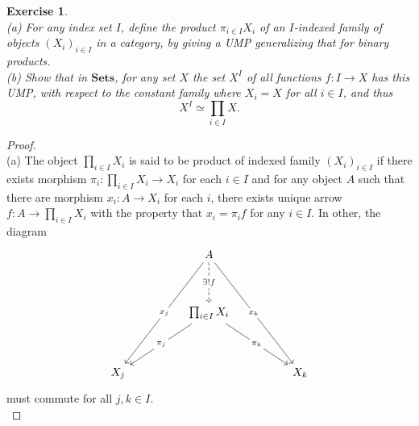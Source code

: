 \documentclass[a4paper, 11pt]{book}
\theoremstyle{plain}
\newtheorem{exercise}{Exercise}[chapter]
\theoremstyle{plain}
\newcommand{\mb}{\mathbf}
\newcommand{\arr}{\rightarrow}
\begin{document}
  \begin{exercise} $ $ \\
    (a) For any index set $I$, define the product $\pi_{i \in I} X_i$ of an $I$-indexed family of objects $(X_i)_{i \in I}$ in a category, by giving a UMP generalizing that for binary products. \\
    (b) Show that in $\mb{Sets}$, for any set $X$ the set $X^I$ of all functions $f:I \arr X$ has this UMP, with respect to the constant family where $X_i=X$ for all $i \in I$, and thus $$X^I \simeq \prod_{i \in I} X.$$
  \end{exercise}
  \begin{proof} $ $ \\
    (a) The object $\prod_{i \in I} X_i$ is said to be product of indexed family $(X_i)_{i \in I}$ if there exists morphism $\pi_i:\prod_{i \in I} X_i \arr X_i$ for each $i \in I$ and for any object $A$ such that there are morphism $x_i: A \arr X_i$ for each $i$, there exists unique arrow $f:A \arr \prod_{i \in I} X_i$ with the property that $x_i=\pi_i f$ for any $i \in I$. In other, the diagram 
    \[\begin{tikzcd}
      && A \\
      \\
      && {\prod_{i \in I} X_i} \\
      \\
      {X_j} &&&& {X_k}
      \arrow["{\exists !f}"{description}, dashed, from=1-3, to=3-3]
      \arrow["{\pi_j}"{description}, from=3-3, to=5-1]
      \arrow["{\pi_k}"{description}, from=3-3, to=5-5]
      \arrow["{x_j}"'{description}, from=1-3, to=5-1]
      \arrow["{x_k}"'{description}, from=1-3, to=5-5]
    \end{tikzcd}\]
    must commute for all $j,k \in I$.  \\


\end{proof}
\end{document}
